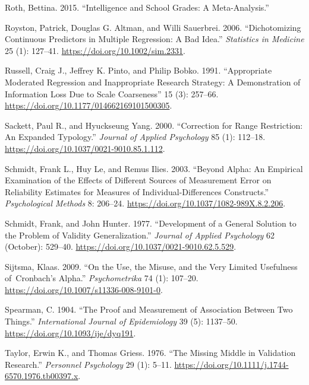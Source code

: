 \documentclass[
  letterpaper,
  DIV=11,
  numbers=noendperiod]{scrreprt}
\newlength{\cslhangindent}
\newlength{\cslentryspacingunit} %
\newenvironment{CSLReferences}[2] %
 {%
  \setlength{\parindent}{0pt}
  \ifodd #1
  \let\oldpar\par
  \def\par{\hangindent=\cslhangindent\oldpar}
  \fi
  \setlength{\parskip}{#2\cslentryspacingunit}
 }%
 {}
\begin{document}
\begin{CSLReferences}{1}{0}
\leavevmode{}%
Roth, Bettina. 2015. {``Intelligence and School Grades: A
Meta-Analysis.''}

\leavevmode{}%
Royston, Patrick, Douglas G. Altman, and Willi Sauerbrei. 2006.
{``Dichotomizing Continuous Predictors in Multiple Regression: A Bad
Idea.''} \emph{Statistics in Medicine} 25 (1): 127--41.
\url{https://doi.org/10.1002/sim.2331}.

\leavevmode{}%
Russell, Craig J., Jeffrey K. Pinto, and Philip Bobko. 1991.
{``Appropriate Moderated Regression and Inappropriate Research Strategy:
A Demonstration of Information Loss Due to Scale Coarseness''} 15 (3):
257--66. \url{https://doi.org/10.1177/014662169101500305}.

\leavevmode{}%
Sackett, Paul R., and Hyuckseung Yang. 2000. {``Correction for Range
Restriction: An Expanded Typology.''} \emph{Journal of Applied
Psychology} 85 (1): 112--18.
\url{https://doi.org/10.1037/0021-9010.85.1.112}.

\leavevmode{}%
Schmidt, Frank L., Huy Le, and Remus Ilies. 2003. {``Beyond Alpha: An
Empirical Examination of the Effects of Different Sources of Measurement
Error on Reliability Estimates for Measures of Individual-Differences
Constructs.''} \emph{Psychological Methods} 8: 206--24.
\url{https://doi.org/10.1037/1082-989X.8.2.206}.

\leavevmode{}%
Schmidt, Frank, and John Hunter. 1977. {``Development of a General
Solution to the Problem of Validity Generalization.''} \emph{Journal of
Applied Psychology} 62 (October): 529--40.
\url{https://doi.org/10.1037/0021-9010.62.5.529}.

\leavevmode{}%
Sijtsma, Klaas. 2009. {``On the Use, the Misuse, and the Very Limited
Usefulness of~Cronbach{'}s Alpha.''} \emph{Psychometrika} 74 (1):
107--20. \url{https://doi.org/10.1007/s11336-008-9101-0}.

\leavevmode{}%
Spearman, C. 1904. {``The Proof and Measurement of Association Between
Two Things.''} \emph{International Journal of Epidemiology} 39 (5):
1137--50. \url{https://doi.org/10.1093/ije/dyq191}.

\leavevmode{}%
Taylor, Erwin K., and Thomas Griess. 1976. {``The Missing Middle in
Validation Research.''} \emph{Personnel Psychology} 29 (1): 5--11.
\url{https://doi.org/10.1111/j.1744-6570.1976.tb00397.x}.


\end{CSLReferences}
\end{document}
